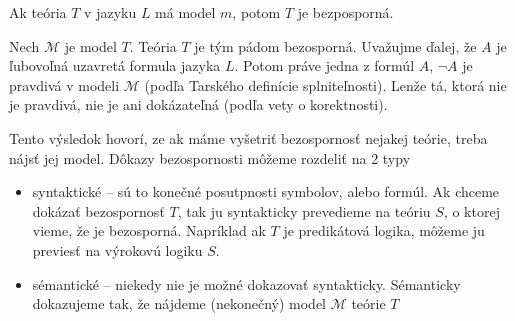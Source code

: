 \begin{dosledok}
    Ak teória $T$ v jazyku $L$ má model $m$, potom $T$ je
    bezposporná.
\end{dosledok}
\begin{dokaz}
    Nech $\mathcal{M}$ je model $T$. Teória $T$ je tým pádom
    bezosporná. Uvažujme ďalej, že $A$ je ľubovoľná uzavretá formula jazyka $L$.
    Potom práve jedna z formúl $A$, $\neg A$ je pravdivá v modeli
    $\mathcal{M}$
    (podľa Tarského definície splniteľnosti).
    Lenže tá, ktorá nie je pravdivá, nie je ani dokázateľná 
    (podľa vety o korektnosti).
\end{dokaz}

\medskip
Tento výsledok hovorí, ze ak máme vyšetriť bezospornosť nejakej teórie,
treba nájsť jej model. Dôkazy bezospornosti môžeme rozdeliť na 2 typy
\begin{itemize}
    \item syntaktické -- sú to konečné posutpnosti symbolov, alebo
        formúl. Ak chceme dokázať bezospornosť $T$, tak ju syntakticky
        prevedieme na teóriu $S$, o ktorej vieme, že je bezosporná.
        Napríklad ak $T$ je predikátová logika, môžeme ju previesť na
        výrokovú logiku $S$.

    \item sémantické -- niekedy nie je možné dokazovať syntakticky.
        Sémanticky dokazujeme tak, že nájdeme (nekonečný) model
        $\mathcal{M}$ teórie $T$
\end{itemize}


